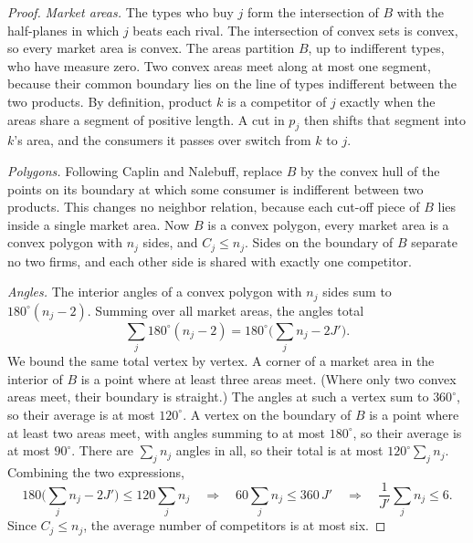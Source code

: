 \begin{proof}
\emph{Market areas.} The types who buy $j$ form the intersection of $B$ with the half-planes in which $j$ beats
each rival. The intersection of convex sets is convex, so every market area is convex. The areas partition $B$,
up to indifferent types, who have measure zero. Two convex areas meet along at most one segment, because their
common boundary lies on the line of types indifferent between the two products. By definition, product $k$ is a
competitor of $j$ exactly when the areas share a segment of positive length. A cut in $p_j$ then shifts that
segment into $k$'s area, and the consumers it passes over switch from $k$ to $j$.

\emph{Polygons.} Following Caplin and Nalebuff, replace $B$ by the convex hull of the points on its boundary at
which some consumer is indifferent between two products. This changes no neighbor relation, because each cut-off
piece of $B$ lies inside a single market area. Now $B$ is a convex polygon, every market area is a convex polygon
with $n_j$ sides, and $C_j \leq n_j$. Sides on the boundary of $B$ separate no two firms, and each other side is
shared with exactly one competitor.

\emph{Angles.} The interior angles of a convex polygon with $n_j$ sides sum to $180^\circ(n_j - 2)$. Summing over all
market areas, the angles total
\begin{equation*}
\sum_j 180^\circ (n_j - 2) = 180^\circ\Big(\sum_j n_j - 2J'\Big).
\end{equation*}
We bound the same total vertex by vertex. A corner of a market area in the interior of $B$ is a point where at
least three areas meet. (Where only two convex areas meet, their boundary is straight.) The angles at such a vertex
sum to $360^\circ$, so their average is at most $120^\circ$. A vertex on the boundary of $B$ is a point where at
least two areas meet, with angles summing to at most $180^\circ$, so their average is at most $90^\circ$. There are
$\sum_j n_j$ angles in all, so their total is at most $120^\circ\sum_j n_j$. Combining the two expressions,
\begin{equation*}
180\Big(\sum_j n_j - 2J'\Big) \leq 120\sum_j n_j
\quad\Longrightarrow\quad
60\sum_j n_j \leq 360\,J'
\quad\Longrightarrow\quad
\frac{1}{J'}\sum_j n_j \leq 6 .
\end{equation*}
Since $C_j \leq n_j$, the average number of competitors is at most six.
\end{proof}

